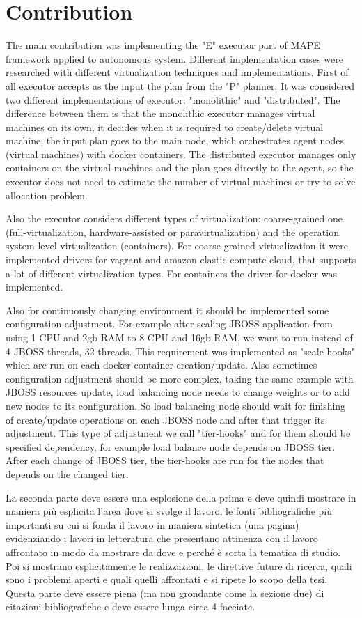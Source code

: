 \section{Contribution}
The main contribution was implementing the "E" executor part of MAPE framework applied to autonomous system. Different implementation cases were researched with different virtualization techniques and implementations.
First of all executor accepts as the input the plan from the  "P" planner. It was considered two different implementations of executor: "monolithic" and "distributed". The difference between them is that the monolithic executor manages virtual machines on its own, it decides when it is required to create/delete virtual machine, the input plan goes to the main node, which orchestrates agent nodes (virtual machines) with docker containers. The distributed executor manages only containers on the virtual machines and the plan goes directly to the agent, so the executor does not need to estimate the number of virtual machines or try to solve allocation problem.

Also the executor considers different types of virtualization: coarse-grained one (full-virtualization, hardware-assisted or paravirtualization) and the operation system-level virtualization (containers). For coarse-grained virtualization it were implemented drivers for vagrant and amazon elastic compute cloud, that supports a lot of different virtualization types. For containers the driver for docker was implemented. 

Also for continuously changing environment it should be implemented some configuration adjustment. For example after scaling JBOSS application from using 1 CPU and 2gb RAM to 8 CPU and 16gb RAM, we want to run instead of 4 JBOSS threads, 32 threads. This requirement was implemented as "scale-hooks" which are run on each docker container creation/update. Also sometimes configuration adjustment should be more complex, taking the same example with JBOSS resources update, load balancing node needs to change weights or to add new nodes to its configuration. So load balancing node should wait for finishing of create/update operations on each JBOSS node and after that trigger its adjustment. This type of adjustment we call "tier-hooks" and for them should be specified dependency, for example load balance node depends on JBOSS tier. After each change of JBOSS tier, the tier-hooks are run for the nodes that depends on the changed tier.


La seconda parte deve essere una esplosione della prima e deve quindi mostrare in maniera pi\`u esplicita l'area dove si svolge il lavoro, le fonti bibliografiche pi\`u importanti su cui si fonda il lavoro in maniera sintetica (una pagina) evidenziando i lavori in letteratura che presentano attinenza con il lavoro affrontato in modo da mostrare da dove e perch\'e \`e sorta la tematica di studio. Poi si mostrano esplicitamente le realizzazioni, le direttive future di ricerca, quali sono i problemi aperti e quali quelli affrontati e si ripete lo scopo della tesi. Questa parte deve essere piena (ma non grondante come la sezione due) di citazioni bibliografiche e deve essere lunga circa 4 facciate.
\fi


